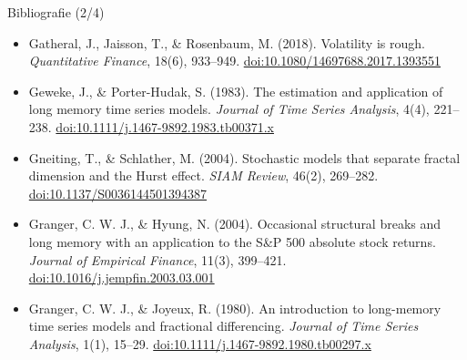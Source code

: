 \begin{frame}{Bibliografie (2/4)}
\begin{itemize}
    \item Gatheral, J., Jaisson, T., \& Rosenbaum, M. (2018). Volatility is rough. \textit{Quantitative Finance}, 18(6), 933--949. \href{https://doi.org/10.1080/14697688.2017.1393551}{doi:10.1080/14697688.2017.1393551}
    \item Geweke, J., \& Porter-Hudak, S. (1983). The estimation and application of long memory time series models. \textit{Journal of Time Series Analysis}, 4(4), 221--238. \href{https://doi.org/10.1111/j.1467-9892.1983.tb00371.x}{doi:10.1111/j.1467-9892.1983.tb00371.x}
    \item Gneiting, T., \& Schlather, M. (2004). Stochastic models that separate fractal dimension and the Hurst effect. \textit{SIAM Review}, 46(2), 269--282. \href{https://doi.org/10.1137/S0036144501394387}{doi:10.1137/S0036144501394387}
    \item Granger, C. W. J., \& Hyung, N. (2004). Occasional structural breaks and long memory with an application to the S\&P 500 absolute stock returns. \textit{Journal of Empirical Finance}, 11(3), 399--421. \href{https://doi.org/10.1016/j.jempfin.2003.03.001}{doi:10.1016/j.jempfin.2003.03.001}
    \item Granger, C. W. J., \& Joyeux, R. (1980). An introduction to long-memory time series models and fractional differencing. \textit{Journal of Time Series Analysis}, 1(1), 15--29. \href{https://doi.org/10.1111/j.1467-9892.1980.tb00297.x}{doi:10.1111/j.1467-9892.1980.tb00297.x}
\end{itemize}
\end{frame}

